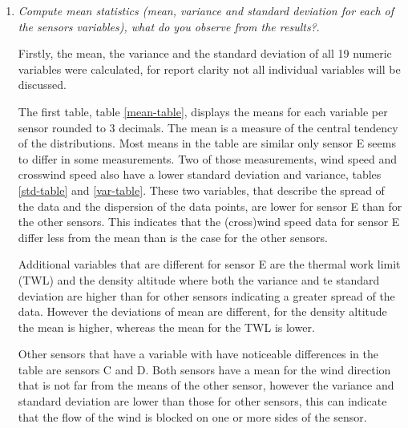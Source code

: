 \documentclass[a4paper,12pt]{article} %
\begin{document}
\begin{enumerate}

\item {\it Compute mean statistics (mean, variance and standard deviation for each of the sensors variables), what do you observe from the results?}. %

Firstly, the mean, the variance and the standard deviation of all 19 numeric variables were calculated, for report clarity not all individual variables will be discussed. 

The first table, table \ref{mean-table}, displays the means for each variable per sensor rounded to 3 decimals. The mean is a measure of the central tendency of the distributions. Most means in the table are similar only sensor E seems to differ in some measurements. Two of those measurements, wind speed and crosswind speed also have a lower standard deviation and variance, tables \ref{std-table} and \ref{var-table}. These two variables, that describe the spread of the data and the dispersion of the data points, are lower for sensor E than for the other sensors. This indicates that the (cross)wind speed data for sensor E differ less from the mean than is the case for the other sensors. 

Additional variables that are different for sensor E are the thermal work limit (TWL) and the density altitude where both the variance and te standard deviation are higher than for other sensors indicating a greater spread of the data. However the deviations of mean are different, for the density altitude the mean is higher, whereas the mean for the TWL is lower. 

Other sensors that have a variable with have noticeable differences in the table are sensors C and D. Both sensors have a mean for the wind direction that is not far from the means of the other sensor, however the variance and standard deviation are lower than those for other sensors, this can indicate that the flow of the wind is blocked on one or more sides of the sensor.
 

\end{enumerate}
\end{document}
